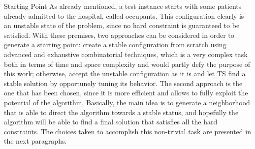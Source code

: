 \begin{section}
 \begin{subsection}
     {Starting Point}
     As already mentioned, a test instance starts with some patients already admitted to the hospital, called occupants.
     This configuration clearly is an unstable state of the problem, since no hard constraint is guaranteed to be satisfied.
     With these premises, two approaches can be considered in order to generate a starting point: create a stable configuration from scratch
     using advanced and exhaustive combinatorial techniques, which is a very complex task both
     in terms of time and space complexity and would partly defy the purpose of this work;
     otherwise, accept the unstable configuration as it is and let TS
     find a stable solution by opportunely tuning its behavior.
     The second approach is the one that has been chosen, since it is more efficient and allows to fully exploit
     the potential of the algorithm.
     Basically, the main idea is to generate a neighborhood that is able to direct the algorithm towards a stable status,
     and hopefully the algorithm will be able to find a final solution that satisfies all the hard constraints.
     The choices taken to accomplish this non-trivial task are presented
     in the next paragraphs.

 \end{subsection}


\end{section}
